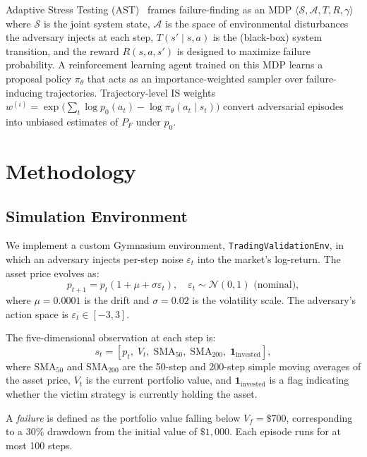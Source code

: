 \documentclass[conference]{IEEEtran}
\newcommand{\mathds}[1]{\mathbf{#1}}
\begin{document}
Adaptive Stress Testing (AST)~\cite{lee2015adaptive,koren2018adaptive,lee2020adaptive} frames failure-finding as
an MDP $\langle \mathcal{S}, \mathcal{A}, T, R, \gamma \rangle$ where
$\mathcal{S}$ is the joint system state, $\mathcal{A}$ is the space of
environmental disturbances the adversary injects at each step,
$T(s'\mid s,a)$ is the (black-box) system transition, and the reward
$R(s,a,s')$ is designed to maximize failure probability.
A reinforcement learning agent trained on this MDP learns a proposal policy
$\pi_\theta$ that acts as an importance-weighted sampler over failure-inducing
trajectories.  Trajectory-level IS weights
$w^{(i)} = \exp\!\bigl(\sum_t \log p_0(a_t) - \log \pi_\theta(a_t \mid s_t)\bigr)$
convert adversarial episodes into unbiased estimates of $P_F$ under $p_0$.

\section{Methodology}

\subsection{Simulation Environment}

We implement a custom Gymnasium environment, \texttt{TradingValidationEnv},
in which an adversary injects per-step noise $\varepsilon_t$ into the
market's log-return. The asset price evolves as:
\begin{equation}
  p_{t+1} = p_t \left(1 + \mu + \sigma \varepsilon_t\right),
  \quad \varepsilon_t \sim \mathcal{N}(0,1) \text{ (nominal)},
\end{equation}
where $\mu = 0.0001$ is the drift and $\sigma = 0.02$ is the volatility
scale. The adversary's action space is $\varepsilon_t \in [-3, 3]$.

The five-dimensional observation at each step is:
\[
  s_t = \left[p_t,\; V_t,\; \text{SMA}_{50},\; \text{SMA}_{200},\; \mathds{1}_{\text{invested}}\right],
\]
where $\text{SMA}_{50}$ and $\text{SMA}_{200}$ are the 50-step and 200-step simple moving averages of the asset price, $V_t$ is the current portfolio value, and $\mathds{1}_{\text{invested}}$
is a flag indicating whether the victim strategy is currently holding the asset.

A \emph{failure} is defined as the portfolio value falling below $V_f = \$700$,
corresponding to a 30\% drawdown from the initial value of $\$1{,}000$.
Each episode runs for at most 100 steps.
\end{document}
